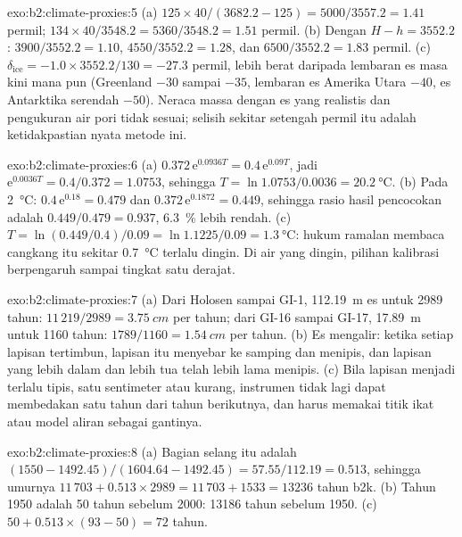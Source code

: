 \begin{solution}{exo:b2:climate-proxies:5}
(a) $125 \times 40/(3682.2 - 125) = 5000/3557.2 = 1.41$ permil; $134 \times 40/3548.2 =
5360/3548.2 = 1.51$ permil. (b) Dengan $H - h = 3552.2$: $3900/3552.2 = 1.10$, $4550/3552.2 = 1.28$,
dan $6500/3552.2 = 1.83$ permil. (c) $\delta_{\mathrm{ice}} = -1.0 \times 3552.2/130 = -27.3$
permil, lebih berat daripada lembaran es masa kini mana pun (Greenland $-30$ sampai $-35$, lembaran es Amerika Utara
$-40$, es Antarktika serendah $-50$). Neraca massa dengan es yang realistis dan pengukuran air
pori tidak sesuai; selisih sekitar setengah permil itu adalah ketidakpastian nyata metode ini.
\end{solution}

\begin{solution}{exo:b2:climate-proxies:6}
(a) $0.372\,\mathrm{e}^{0.0936T} = 0.4\,\mathrm{e}^{0.09T}$, jadi $\mathrm{e}^{0.0036T} =
0.4/0.372 = 1.0753$, sehingga $T = \ln 1.0753/0.0036 = \qty{20.2}{\celsius}$. (b) Pada
\qty{2}{\celsius}: $0.4\,\mathrm{e}^{0.18} = 0.479$ dan $0.372\,\mathrm{e}^{0.1872} = 0.449$, sehingga
rasio hasil pencocokan adalah $0.449/0.479 = 0.937$, \qty{6.3}{\percent} lebih rendah. (c) $T = \ln(0.449/0.4)/0.09 =
\ln 1.1225/0.09 = \qty{1.3}{\celsius}$: hukum ramalan membaca cangkang itu sekitar
\qty{0.7}{\celsius} terlalu dingin. Di air yang dingin, pilihan kalibrasi berpengaruh sampai tingkat satu
derajat.
\end{solution}

\begin{solution}{exo:b2:climate-proxies:7}
(a) Dari Holosen sampai GI-1, \qty{112.19}{m} es untuk 2989 tahun: $11\,219/2989 =
\qty{3.75}{cm}$ per tahun; dari GI-16 sampai GI-17, \qty{17.89}{m} untuk 1160 tahun: $1789/1160 =
\qty{1.54}{cm}$ per tahun. (b) Es
mengalir: ketika setiap lapisan tertimbun, lapisan itu menyebar ke samping dan menipis, dan lapisan yang lebih dalam dan lebih tua
telah lebih lama menipis. (c) Bila lapisan menjadi terlalu tipis, satu sentimeter atau kurang, instrumen
tidak lagi dapat membedakan satu tahun dari tahun berikutnya, dan  harus memakai titik ikat atau model aliran
sebagai gantinya.
\end{solution}

\begin{solution}{exo:b2:climate-proxies:8}
(a) Bagian selang itu adalah $(1550 - 1492.45)/(1604.64 - 1492.45) = 57.55/112.19 = 0.513$,
sehingga umurnya $11\,703 + 0.513 \times 2989 = 11\,703 + 1533 = \num{13236}$ tahun b2k. (b) Tahun 1950 adalah 50
tahun sebelum 2000: \num{13186} tahun sebelum 1950. (c) $50 + 0.513 \times (93 - 50) = 72$ tahun.
\end{solution}

